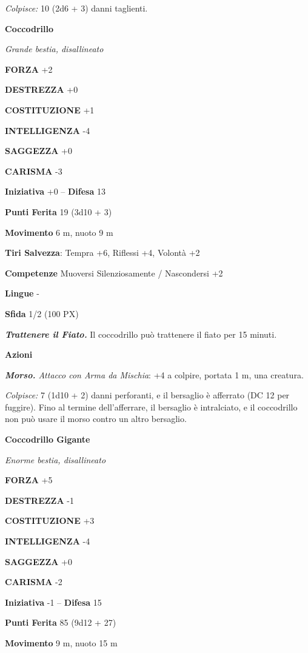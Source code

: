 \begin{multicols}{2}
\textit{Colpisce:} 10 (2d6 + 3) danni taglienti.

\medskip\textbf{Coccodrillo}

\textit{Grande bestia, disallineato}

\textbf{FORZA} +2

\textbf{DESTREZZA} +0

\textbf{COSTITUZIONE} +1

\textbf{INTELLIGENZA} -4

\textbf{SAGGEZZA} +0

\textbf{CARISMA} -3

\textbf{Iniziativa} +0 -- \textbf{Difesa} 13

\textbf{Punti Ferita} 19 (3d10 + 3)

\textbf{Movimento} 6 m, nuoto 9 m

\textbf{Tiri Salvezza}: Tempra +6, Riflessi +4, Volontà +2

\textbf{Competenze} Muoversi Silenziosamente / Nascondersi +2

\textbf{Lingue} -

\textbf{Sfida} 1/2 (100 PX)

\textit{\textbf{Trattenere il Fiato.}} Il coccodrillo può trattenere il fiato per 15 minuti.

\textbf{Azioni}

\textit{\textbf{Morso.} Attacco con Arma da Mischia}: +4 a colpire, portata 1 m, una creatura.

\textit{Colpisce:} 7 (1d10 + 2) danni perforanti, e il bersaglio è afferrato (DC 12 per fuggire). Fino al termine dell'afferrare, il bersaglio è intralciato, e il coccodrillo non può usare il morso contro un altro bersaglio.

\medskip\textbf{Coccodrillo Gigante}

\textit{Enorme bestia, disallineato}

\textbf{FORZA} +5

\textbf{DESTREZZA} -1

\textbf{COSTITUZIONE} +3

\textbf{INTELLIGENZA} -4

\textbf{SAGGEZZA} +0

\textbf{CARISMA} -2

\textbf{Iniziativa} -1 -- \textbf{Difesa} 15

\textbf{Punti Ferita} 85 (9d12 + 27)

\textbf{Movimento} 9 m, nuoto 15 m


\end{multicols}
